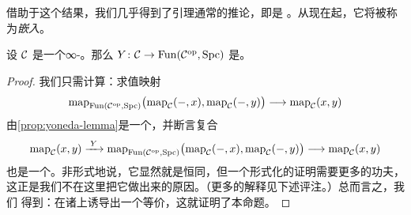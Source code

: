 借助于这个结果，我们几乎得到了\trYoneda{}引理通常的推论，即\trYoneda{}\trFunctor{}是%
\trFullyFaithful{}。从现在起，它将被称为\emph{\trYoneda{}嵌入}。

\begin{proposition}\label{prop:yoneda-embedding}
设 $\mathcal{C}$ 是一个∞-\trCategory{}。那么\trYoneda{}\trFunctor{}%
$Y\colon \mathcal{C} \to \mathrm{Fun}(\mathcal{C}^{\mathrm{op}}, \mathrm{Spc})$
是\trFullyFaithful{}。
\end{proposition}

\begin{proof}
我们只需计算：求值映射
\[
\mathrm{map}_{\mathrm{Fun}(\mathcal{C}^{\mathrm{op}}, \mathrm{Spc})}
  \bigl(\mathrm{map}_{\mathcal{C}}(-, x), \mathrm{map}_{\mathcal{C}}(-, y)\bigr)
  \longrightarrow \mathrm{map}_{\mathcal{C}}(x, y)
\]
由\cref{prop:yoneda-lemma}是一个\trEquivalence{}，并断言复合
\[
\mathrm{map}_{\mathcal{C}}(x, y) \xrightarrow{\;Y\;}
  \mathrm{map}_{\mathrm{Fun}(\mathcal{C}^{\mathrm{op}}, \mathrm{Spc})}
  \bigl(\mathrm{map}_{\mathcal{C}}(-, x), \mathrm{map}_{\mathcal{C}}(-, y)\bigr)
  \longrightarrow \mathrm{map}_{\mathcal{C}}(x, y)
\]
也是一个\trEquivalence{}。非形式地说，它显然就是恒同，但一个形式化的证明需要更多的功夫，
这正是我们不在这里把它做出来的原因。（更多的解释见下述评注。）总而言之，我们
得到：\trYoneda{}\trFunctor{}在诸\trMappingSpace{}上诱导出一个等价，这就证明了本命题。
\end{proof}

